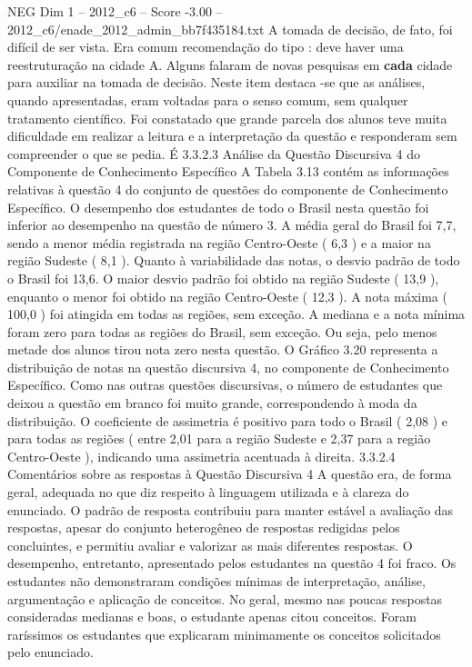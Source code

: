 \begin{textsample}{NEG Dim 1 – 2012\_c6 – Score -3.00 – 2012\_c6/enade\_2012\_admin\_bb7f435184.txt}
A tomada de decisão, de fato, foi difícil de ser vista.
Era comum recomendação do tipo : deve haver uma reestruturação na cidade A.
Alguns falaram de novas pesquisas em \textbf{cada} cidade para auxiliar na tomada de decisão.
Neste item destaca -se que as análises, quando apresentadas, eram voltadas para o senso comum, sem qualquer tratamento científico.
Foi constatado que grande parcela dos alunos teve muita dificuldade em realizar a leitura e a interpretação da questão e responderam sem compreender o que se pedia.
É 3.3.2.3 Análise da Questão Discursiva 4 do Componente de Conhecimento Específico A Tabela 3.13 contém as informações relativas à questão 4 do conjunto de questões do componente de Conhecimento Específico.
O desempenho dos estudantes de todo o Brasil nesta questão foi inferior ao desempenho na questão de número 3.
A média geral do Brasil foi 7,7, sendo a menor média registrada na região Centro-Oeste ( 6,3 ) e a maior na região Sudeste ( 8,1 ).
Quanto à variabilidade das notas, o desvio padrão de todo o Brasil foi 13,6.
O maior desvio padrão foi obtido na região Sudeste ( 13,9 ), enquanto o menor foi obtido na região Centro-Oeste ( 12,3 ).
A nota máxima ( 100,0 ) foi atingida em todas as regiões, sem exceção.
A mediana e a nota mínima foram zero para todas as regiões do Brasil, sem exceção.
Ou seja, pelo menos metade dos alunos tirou nota zero nesta questão.
O Gráfico 3.20 representa a distribuição de notas na questão discursiva 4, no componente de Conhecimento Específico.
Como nas outras questões discursivas, o número de estudantes que deixou a questão em branco foi muito grande, correspondendo à moda da distribuição.
O coeficiente de assimetria é positivo para todo o Brasil ( 2,08 ) e para todas as regiões ( entre 2,01 para a região Sudeste e 2,37 para a região Centro-Oeste ), indicando uma assimetria acentuada à direita. 3.3.2.4 Comentários sobre as respostas à Questão Discursiva 4 A questão era, de forma geral, adequada no que diz respeito à linguagem utilizada e à clareza do enunciado.
O padrão de resposta contribuiu para manter estável a avaliação das respostas, apesar do conjunto heterogêneo de respostas redigidas pelos concluintes, e permitiu avaliar e valorizar as mais diferentes respostas.
O desempenho, entretanto, apresentado pelos estudantes na questão 4 foi fraco.
Os estudantes não demonstraram condições mínimas de interpretação, análise, argumentação e aplicação de conceitos.
No geral, mesmo nas poucas respostas consideradas medianas e boas, o estudante apenas citou conceitos.
Foram raríssimos os estudantes que explicaram minimamente os conceitos solicitados pelo enunciado.

\end{textsample}

